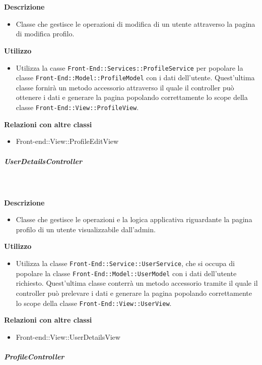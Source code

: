 				\textbf{\\ \\ Descrizione} 
					\begin{itemize}
						\item[] Classe che gestisce le operazioni di modifica di un utente attraverso la pagina di modifica profilo.
					\end{itemize}      
				\textbf{Utilizzo}  
					\begin{itemize}
						\item[] Utilizza la casse \texttt{Front-End::Services::ProfileService} per popolare la classe \texttt{Front-End::Model::ProfileModel} con i dati dell'utente. Quest'ultima classe fornirà un metodo accessorio attraverso il quale il controller può ottenere i dati e generare la pagina popolando correttamente lo scope della classe \texttt{Front-End::View::ProfileView}.
					\end{itemize}
					\textbf{Relazioni con altre classi}
					\begin{itemize}
							\item{Front-end::View::ProfileEditView}
					\end{itemize}
			\subparagraph{UserDetailsController}
				
				\textbf{\\ \\ Descrizione} 
					\begin{itemize}
						\item[] Classe che gestisce le operazioni e la logica applicativa riguardante la pagina profilo di un utente visualizzabile dall'admin.
					\end{itemize}      
				\textbf{Utilizzo}  
					\begin{itemize}
						\item[] Utilizza la classe \texttt{Front-End::Service::UserService}, che si occupa di popolare la classe \texttt{Front-End::Model::UserModel} con i dati dell'utente richiesto. Quest'ultima classe conterrà un metodo accessorio tramite il quale il controller può prelevare i dati e generare la pagina popolando correttamente lo scope della classe \texttt{Front-End::View::UserView}.
					\end{itemize}
					\textbf{Relazioni con altre classi}
					\begin{itemize}
							\item{Front-end::View::UserDetailsView}
					\end{itemize}
			\subparagraph{ProfileController}
				
